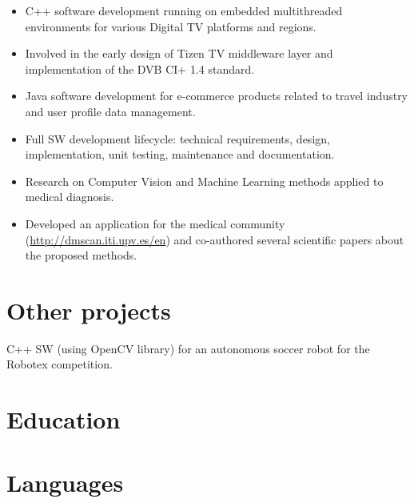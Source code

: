 \documentclass[11pt,a4paper,sans]{moderncv}
\begin{document}
{
  \begin{itemize}
  \item C++ software development running on embedded multithreaded environments for various Digital TV platforms and regions.
  \item Involved in the early design of Tizen TV middleware layer and implementation of the DVB CI+ 1.4 standard.
  \end{itemize}
}

{
  \begin{itemize}
  \item Java software development for e-commerce products related to travel industry and user profile data management.
  \item Full SW development lifecycle: technical requirements, design, implementation, unit testing, maintenance and documentation.
  \end{itemize}
}

{ \begin{itemize}
  \item Research on Computer Vision and Machine Learning methods applied to medical diagnosis.
  \item Developed an application for the medical community (\url{http://dmscan.iti.upv.es/en}) and co-authored several scientific papers about the proposed methods.
\end{itemize} }

\section{Other projects}
{
  C++ SW (using OpenCV library) for an autonomous soccer robot for the Robotex competition.
}

\section{Education}

\section{Languages}
\begin{multicols}{3}
\end{multicols}

\renewcommand{\listitemsymbol}{-~}            %
\end{document}
